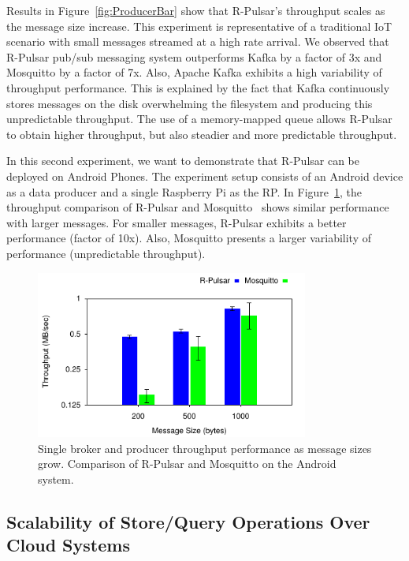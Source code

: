 Results in Figure~\ref{fig:ProducerBar} show that R-Pulsar's throughput scales as the message size increase. This experiment is representative of a traditional IoT scenario with small messages streamed at a high rate arrival.
We observed that R-Pulsar pub/sub messaging system outperforms Kafka by a factor of 3x and Mosquitto by a factor of 7x. Also, Apache Kafka exhibits a high variability of throughput performance. 
This is explained by the fact that Kafka continuously stores messages on the disk overwhelming the filesystem and producing this unpredictable throughput.
The use of a memory-mapped queue allows R-Pulsar to obtain higher throughput, but also steadier and more predictable throughput.

In this second experiment, we want to demonstrate that R-Pulsar can be deployed on  Android Phones.  
The experiment setup consists of an Android device as a data producer and a single Raspberry Pi as the RP.
In Figure~\ref{fig:ProducerPhone}, the throughput comparison of R-Pulsar and Mosquitto~\cite{mosquitto} shows similar performance with larger messages. For smaller messages, R-Pulsar exhibits a better performance (factor of 10x). Also, Mosquitto presents a larger variability of performance (unpredictable throughput).

\begin{figure}[h!]
  \centering
  \includegraphics[width=0.8\textwidth]{Results/ProducerPhone}
  \caption{Single broker and producer throughput performance as message sizes grow. Comparison of R-Pulsar and Mosquitto on the Android system.}
  \label{fig:ProducerPhone}

\end{figure}

\subsection{Scalability of Store/Query Operations Over Cloud Systems}

